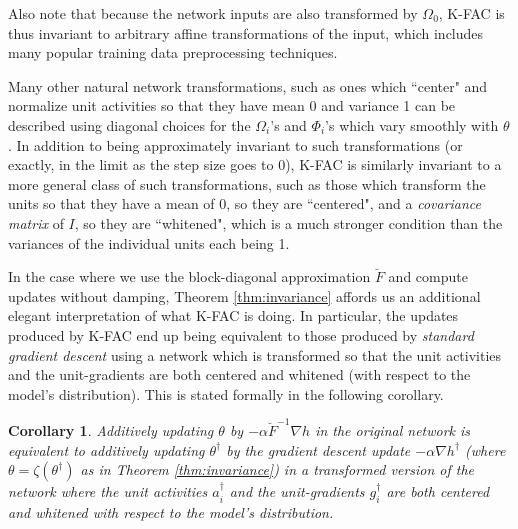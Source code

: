 \documentclass[12pt]{article}
\newcommand{\acronym}{K-FAC}
\newtheorem{corollary}[theorem]{Corollary}
\begin{document}
Also note that because the network inputs are also transformed by $\Omega_0$, \acronym{} is thus invariant to arbitrary affine transformations of the input, which includes many popular training data preprocessing techniques.  %

Many other natural network transformations, such as ones which ``center" and normalize unit activities so that they have mean 0 and variance 1 can be described using diagonal choices for the $\Omega_i$'s and $\Phi_i$'s which vary smoothly with $\theta$.  In addition to being approximately invariant to such transformations (or exactly, in the limit as the step size goes to 0), \acronym{} is similarly invariant to a more general class of such transformations, such as those which transform the units so that they have a mean of 0, so they are ``centered", and a \emph{covariance matrix} of $I$, so they are ``whitened", which is a much stronger condition than the variances of the individual units each being 1.  


In the case where we use the block-diagonal approximation $\breve{F}$ and compute updates without damping, Theorem \ref{thm:invariance} affords us an additional elegant interpretation of what \acronym{} is doing.  In particular, the updates produced by \acronym{} end up being equivalent to those produced by \emph{standard gradient descent} using a network which is transformed so that the unit activities and the unit-gradients are both centered and whitened (with respect to the model's distribution).  This is stated formally in the following corollary.
\begin{corollary}
\label{cor:whitened_interpretation}
Additively updating $\theta$ by $-\alpha \breve{F}^{-1} \nabla h$ in the original network is equivalent to additively updating $\theta^\dagger$ by the gradient descent update $-\alpha \nabla h^\dagger$ (where $\theta = \zeta(\theta^\dagger)$ as in Theorem \ref{thm:invariance}) in a transformed version of the network where the unit activities $a^\dagger_i$ and the unit-gradients $g^\dagger_i$ are both centered and whitened with respect to the model's distribution.
\end{corollary}
\end{document}
